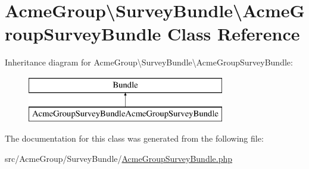\hypertarget{class_acme_group_1_1_survey_bundle_1_1_acme_group_survey_bundle}{\section{Acme\+Group\textbackslash{}Survey\+Bundle\textbackslash{}Acme\+Group\+Survey\+Bundle Class Reference}
\label{class_acme_group_1_1_survey_bundle_1_1_acme_group_survey_bundle}
}
Inheritance diagram for Acme\+Group\textbackslash{}Survey\+Bundle\textbackslash{}Acme\+Group\+Survey\+Bundle\+:\begin{figure}[H]
\begin{center}
\leavevmode
\includegraphics[height=2.000000cm]{class_acme_group_1_1_survey_bundle_1_1_acme_group_survey_bundle}
\end{center}
\end{figure}


The documentation for this class was generated from the following file\+:\begin{DoxyCompactItemize}
\item 
src/\+Acme\+Group/\+Survey\+Bundle/\hyperlink{_acme_group_survey_bundle_8php}{Acme\+Group\+Survey\+Bundle.\+php}\end{DoxyCompactItemize}
